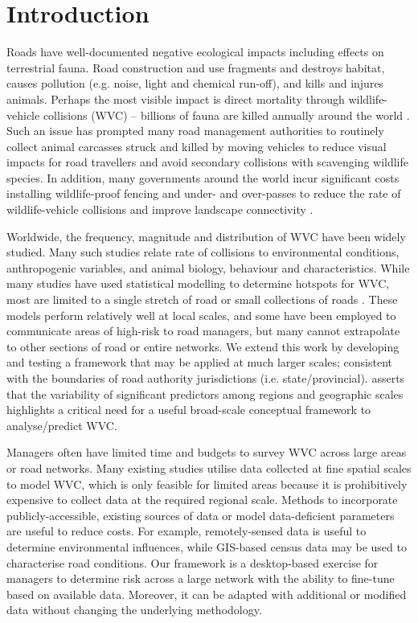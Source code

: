 \newpage
\section{Introduction}

Roads have well-documented negative ecological impacts \citep{form98,spel98,rvdr15} including effects on terrestrial fauna. Road construction and use fragments and destroys habitat, causes pollution (e.g. noise, light and chemical run-off), and kills and injures animals. Perhaps the most visible impact is direct mortality through wildlife-vehicle collisions (WVC) -- billions of fauna are killed annually around the world \citep{seil06}. Such an issue has prompted many road management authorities to routinely collect animal carcasses struck and killed by moving vehicles to reduce visual impacts for road travellers \citep{huij07b} and avoid secondary collisions with scavenging wildlife species. In addition, many governments around the world incur significant costs installing wildlife-proof fencing and under- and over-passes to reduce the rate of wildlife-vehicle collisions and improve landscape connectivity \citep{rvdr15}.

Worldwide, the frequency, magnitude and distribution of WVC have been widely studied. Many such studies relate rate of collisions to environmental conditions, anthropogenic variables, and animal biology, behaviour and characteristics. While many studies have used statistical modelling to determine hotspots for WVC, most are limited to a single stretch of road or small collections of roads \citep{gund98,clev01,clev03,ramp05,ramp06b,gome08,lang09,hurl09,roge09,hoth12,mark12,sant13,seo15}. These models perform relatively well at local scales, and some have been employed to communicate areas of high-risk to road managers, but many cannot extrapolate to other sections of road or entire networks. We extend this work by developing and testing a framework that may be applied at much larger scales; consistent with the boundaries of road authority jurisdictions (i.e. state/provincial). \cite{clev15} asserts that the variability of significant predictors among regions and geographic scales highlights a critical need for a useful broad-scale conceptual framework to analyse/predict WVC.

Managers often have limited time and budgets to survey WVC across large areas or road networks. Many existing studies utilise data collected at fine spatial scales to model WVC, which is only feasible for limited areas because it is prohibitively expensive to collect data at the required regional scale. Methods to incorporate publicly-accessible, existing sources of data or model data-deficient parameters are useful to reduce costs. For example, remotely-sensed data is useful to determine environmental influences, while GIS-based census data may be used to characterise road conditions. Our framework is a desktop-based exercise for managers to determine risk across a large network with the ability to fine-tune based on available data. Moreover, it can be adapted with additional or modified data without changing the underlying methodology.


